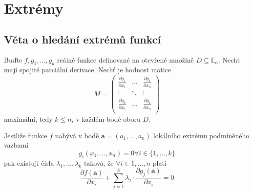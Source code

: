 \documentclass[../main.tex]{subfiles}
\begin{document}
\section{Extrémy}
\hspace{1.2mm}
\noindent

\subsection{Věta o hledání extrémů funkcí}
\hspace{1.2mm}
\noindent
Buďte $f,g_1, ... , g_k$ reálné funkce definované na otevřené množině $D \subseteq \mathbb{E}_n$.
Nechť mají spojité parciální derivace. Nechť je hodnost matice
\[ M = \begin{pmatrix}
\frac{\partial g_1}{\partial x_1} & \dots & \frac{\partial g_1}{\partial x_n}\\
\vdots & \ddots & \vdots\\
\frac{\partial g_k}{\partial x_1} & \dots & \frac{\partial g_k}{\partial x_n}\\
\end{pmatrix}\]
maximální, tedy $k \leq n$, v každém bodě oboru $D$.

\noindent
\hspace{1.2mm}
Jestliže funkce $f$ nabývá v bodě $\mathbf{a} = (a_1, ... , a_n)$ lokálního extrému podmíněného vazbami
\[ g_i(x_1, ... , x_n) = 0 \forall i \in \{ 1, ... , k \} \]
pak existují čísla $\lambda _1, ... , \lambda _k$ taková, že $\forall i \in {1, ... , n}$ platí
\[ \frac{\partial f(\mathbf{a})}{\partial x_i} +
\sum_{j=1}^{k}\lambda_j \cdot \frac{\partial g_j(\mathbf{a})}{\partial x_i} = 0 \]
\end{document}
